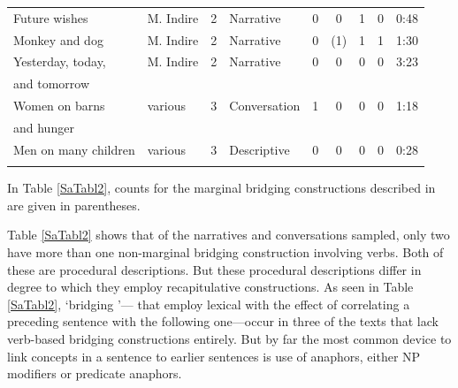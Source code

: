 \documentclass[output=paper]{LSP/langsci}
\begin{document}
\begin{table}
\begin{tabular}{llclccccl}
Future wishes              & M. Indire        & 2     & Narrative      & 0                    & 0                     & 1                & 0                  & 0:48             \\
Monkey and dog             & M. Indire        & 2     & Narrative      & 0                    & (1)                   & 1                & 1                  & 1:30             \\
Yesterday, today,  & M. Indire        & 2     & Narrative      & 0                    & 0                     & 0                & 0                  & 3:23             \\
and tomorrow &         &      &       &                     &                      &                 &                   &             \\
Women on barns   & various          & 3       & Conversation  & 1                    & 0                     & 0                & 0                  & 1:18             \\
 and hunger  &           &        &   &                     &                      &                 &                   &           \\
Men on many children       & various          & 3      & Descriptive    & 0                    & 0                     & 0                & 0                  & 0:28        \\  
\lspbottomrule  
\end{tabular}
\end{table}
%

In Table \ref{SaTabl2}, counts for the marginal bridging constructions described in  are given in parentheses.  
 
Table \ref{SaTabl2} shows that of the narratives and conversations sampled, only two have more than one non-marginal bridging construction involving verbs. Both of these are procedural descriptions. But these procedural descriptions differ in degree to which they employ recapitulative constructions. As seen in Table \ref{SaTabl2}, `bridging '— that employ lexical  with the effect of correlating a preceding sentence with the following one—occur in three of the texts that lack verb-based bridging constructions entirely. But by far the most common device to link concepts in a sentence to earlier sentences is use of anaphors, either NP modifiers or predicate anaphors. 
\end{document}
